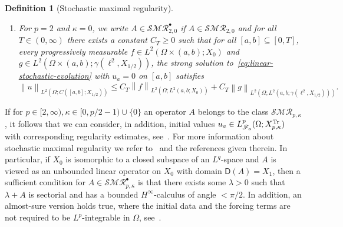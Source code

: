 \documentclass[reqno]{amsart}
\newtheorem{definition}[Satz]{Definition}
\newcommand{\F}{\mathscr{F}}
\newcommand{\seq}{\subseteq}
\newcommand{\1}{\mathbf{1}}
\newcommand{\nrm}[1]{\left\lVert #1 \right\rVert}
\begin{document}
\begin{definition}[Stochastic maximal regularity]
\begin{enumerate}
\begin{equation}
        \end{equation}
        \item For $p=2$ and $\kappa=0$, we write $A\in \mathcal{SMR}_{2,0}^\bullet$ if $A\in \mathcal{SMR}_{2,0}$ and for all $T\in (0,\infty)$ there exists a constant $C_T\ge 0$ such that for all $[a,b]\seq [0,T]$, every progressively measurable $f\in L^2(\Omega\times(a,b);X_0)$ and $g\in L^2(\Omega\times(a,b);\gamma(\ell^2,X_{1/2}))$, the strong solution to~\eqref{eq:linear-stochastic-evolution} with $u_a=0$ on $[a,b]$ satisfies
        \begin{equation}
            \nrm{u}_{L^2(\Omega;C([a,b];X_{1/2}))}\le C_T\nrm{f}_{L^2(\Omega;L^2(a,b;X_0))}+C_T\nrm{g}_{L^2(\Omega;L^2(a,b;\gamma(\ell^2,X_{1/2})))}.
        \end{equation}
    \end{enumerate}
\end{definition}
If for $p\in [2,\infty), \kappa\in [0,p/2-1)\cup\{0\}$ an operator $A$ belongs to the class $ \mathcal{SMR}_{p,\kappa}$, it follows that we can consider, in addition, initial values $u_a \in L_{\F_a}^p(\Omega;X_{p,\kappa}^{\textup{Tr}})$ with corresponding regularity estimates, see~\cite[Proposition 3.9]{agrestiNonlinearParabolicStochastic2022a}. 
For more information about stochastic maximal regularity we refer to~\cite{agrestiNonlinearParabolicStochastic2022,agrestiNonlinearParabolicStochastic2022a,agrestiNonlinearSPDEsMaximal2025} and the references given therein. 
In particular, if $X_0$ is isomorphic to a closed subspace of an $L^q$-space and $A$ is viewed as an unbounded linear operator on $X_0$ with domain $\mathsf{D}(A)=X_1$, then a sufficient condition for $A\in \mathcal{SMR}_{p,\kappa}^\bullet$ is that  there exists some $\lambda>0$ such that $\lambda+A$ is sectorial and has a bounded $H^\infty$-calculus of angle $<\pi/2$. In addition, an almost-sure version holds true, where the initial data and the forcing terms are not required to be $L^p$-integrable in $\Omega$, see~\cite[Proposition 3.11]{agrestiNonlinearSPDEsMaximal2025}.
\end{document}
